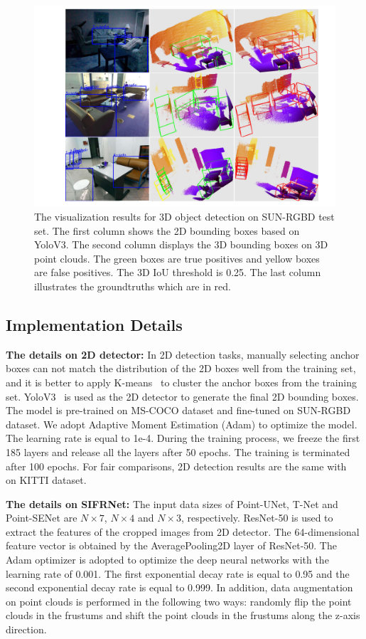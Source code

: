 \documentclass[letterpaper]{article} %
\begin{document}
\begin{figure}[h]
\begin{center}
  \includegraphics[width=0.95\linewidth]{SUN_Results.pdf}
\end{center}
\caption{The visualization results for 3D object detection on SUN-RGBD test set. The first column shows the 2D bounding boxes based on YoloV3. The second column displays the 3D bounding boxes on 3D point clouds. The green boxes are true positives and yellow boxes are false positives. The 3D IoU threshold is 0.25. The last column illustrates the groundtruths which are in red.}
\end{figure}


\subsection{Implementation Details}
{\bf The details on 2D detector:} In 2D detection tasks, manually selecting anchor boxes can not match the distribution of the 2D boxes well from the training set, and it is better to apply K-means~\cite{jain2010data} to cluster the anchor boxes from the training set. YoloV3~\cite{redmon2018yolov3} is used as the 2D detector to generate the final 2D bounding boxes. The model is pre-trained on MS-COCO dataset and fine-tuned on SUN-RGBD dataset. We adopt Adaptive Moment Estimation (Adam) to optimize the model. The learning rate is equal to 1e-4. During the training process, we freeze the first 185 layers and release all the layers after 50 epochs. The training is terminated after 100 epochs. For fair comparisons, 2D detection results are the same with~\cite{qi2017frustum} on KITTI dataset.

{\bf The details on SIFRNet:} The input data sizes of Point-UNet, T-Net and Point-SENet are $N{\times}7$, $N{\times}4$ and $N{\times}3$, respectively. ResNet-50 is used to extract the features of the cropped images from 2D detector. The 64-dimensional feature vector is obtained by the AveragePooling2D layer of ResNet-50. The Adam optimizer is adopted to optimize the deep neural networks with the learning rate of 0.001. The first exponential decay rate is equal to 0.95 and the second exponential decay rate is equal to 0.999. In addition, data augmentation on point clouds is performed in the following two ways: randomly flip the point clouds in the frustums and shift the point clouds in the frustums along the z-axis direction.
\end{document}
